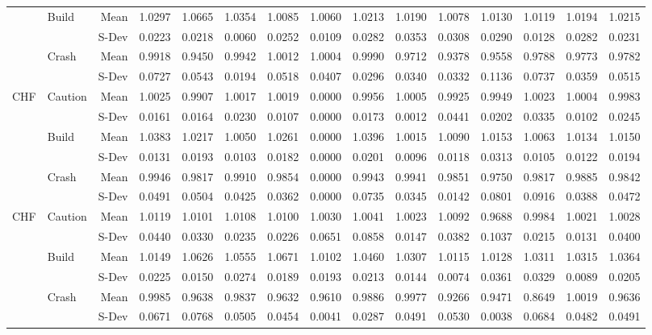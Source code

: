 \documentclass[12pt, a4paper, oneside]{article} %
\begin{document}
\begin{landscape}
\begin{table}[ht]
\begin{tabular}{llrrrrrrrrrrrrr}
  & \multirow{2}{*}{Build} & Mean & 1.0297 & 1.0665 & 1.0354 & 1.0085 & 1.0060 & 1.0213 & 1.0190 & 1.0078 & 1.0130 & 1.0119 & 1.0194 & 1.0215\\ 
  && S-Dev & 0.0223 & 0.0218 & 0.0060 & 0.0252 & 0.0109 & 0.0282 & 0.0353 & 0.0308 & 0.0290 & 0.0128 & 0.0282 & 0.0231 \\ 
  & \multirow{2}{*}{Crash} & Mean & 0.9918 & 0.9450 & 0.9942 & 1.0012 & 1.0004 & 0.9990 & 0.9712 & 0.9378 & 0.9558 & 0.9788 & 0.9773 & 0.9782\\ 
  && S-Dev & 0.0727 & 0.0543 & 0.0194 & 0.0518 & 0.0407 & 0.0296 & 0.0340 & 0.0332 & 0.1136 & 0.0737 & 0.0359 & 0.0515\\ 
\hline
\multirow{6}{*}{CHF}& \multirow{2}{*}{Caution} & Mean& 1.0025 & 0.9907 & 1.0017 & 1.0019 & 0.0000 & 0.9956 & 1.0005 & 0.9925 & 0.9949 & 1.0023 & 1.0004 & 0.9983\\ 
  && S-Dev & 0.0161 & 0.0164 & 0.0230 & 0.0107 & 0.0000 & 0.0173 & 0.0012 & 0.0441 & 0.0202 & 0.0335 & 0.0102 & 0.0245\\ 
  & \multirow{2}{*}{Build} &  Mean & 1.0383 & 1.0217 & 1.0050 & 1.0261 & 0.0000 & 1.0396 & 1.0015 & 1.0090 & 1.0153 & 1.0063 & 1.0134 & 1.0150\\ 
  && S-Dev & 0.0131 & 0.0193 & 0.0103 & 0.0182 & 0.0000 & 0.0201 & 0.0096 & 0.0118 & 0.0313 & 0.0105 & 0.0122 & 0.0194\\ 
  & \multirow{2}{*}{Crash} & Mean & 0.9946 & 0.9817 & 0.9910 & 0.9854 & 0.0000 & 0.9943 & 0.9941 & 0.9851 & 0.9750 & 0.9817 & 0.9885 & 0.9842 \\ 
  &&S-Dev & 0.0491 & 0.0504 & 0.0425 & 0.0362 & 0.0000 & 0.0735 & 0.0345 & 0.0142 & 0.0801 & 0.0916 & 0.0388 & 0.0472\\ 
\hline
\multirow{6}{*}{CHF}& \multirow{2}{*}{Caution} & Mean & 1.0119 & 1.0101 & 1.0108 & 1.0100 & 1.0030 & 1.0041 & 1.0023 & 1.0092 & 0.9688 & 0.9984 & 1.0021 & 1.0028\\ 
  && S-Dev& 0.0440 & 0.0330 & 0.0235 & 0.0226 & 0.0651 & 0.0858 & 0.0147 & 0.0382 & 0.1037 & 0.0215 & 0.0131 & 0.0400\\ 
  & \multirow{2}{*}{Build} & Mean & 1.0149 & 1.0626 & 1.0555 & 1.0671 & 1.0102 & 1.0460 & 1.0307 & 1.0115 & 1.0128 & 1.0311 & 1.0315 & 1.0364\\ 
  && S-Dev & 0.0225 & 0.0150 & 0.0274 & 0.0189 & 0.0193 & 0.0213 & 0.0144 & 0.0074 & 0.0361 & 0.0329 & 0.0089 & 0.0205\\ 
  & \multirow{2}{*}{Crash} & Mean & 0.9985 & 0.9638 & 0.9837 & 0.9632 & 0.9610 & 0.9886 & 0.9977 & 0.9266 & 0.9471 & 0.8649 & 1.0019 & 0.9636 \\ 
  && S-Dev& 0.0671 & 0.0768 & 0.0505 & 0.0454 & 0.0041 & 0.0287 & 0.0491 & 0.0530 & 0.0038 & 0.0684 & 0.0482 & 0.0491\\ 
   \hline
\end{tabular}
\label{tabref:3StateProb}
\end{table}
\end{landscape}
\end{document}
